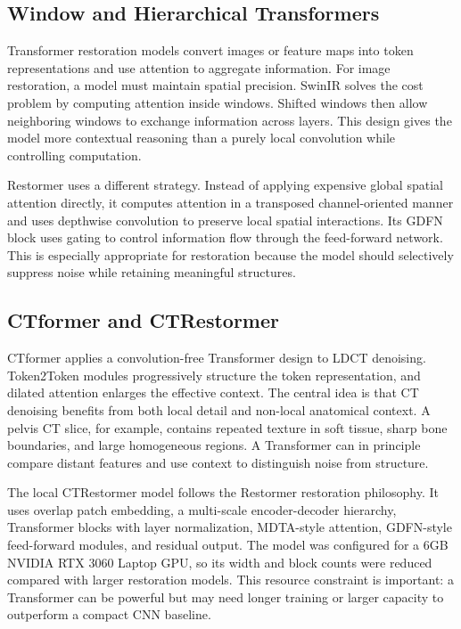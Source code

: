 \documentclass[journal]{IEEEtran}
\begin{document}
\subsection{Window and Hierarchical Transformers}
Transformer restoration models convert images or feature maps into token representations and use attention to aggregate information. For image restoration, a model must maintain spatial precision. SwinIR solves the cost problem by computing attention inside windows. Shifted windows then allow neighboring windows to exchange information across layers. This design gives the model more contextual reasoning than a purely local convolution while controlling computation.

Restormer uses a different strategy. Instead of applying expensive global spatial attention directly, it computes attention in a transposed channel-oriented manner and uses depthwise convolution to preserve local spatial interactions. Its GDFN block uses gating to control information flow through the feed-forward network. This is especially appropriate for restoration because the model should selectively suppress noise while retaining meaningful structures.

\subsection{CTformer and CTRestormer}
CTformer applies a convolution-free Transformer design to LDCT denoising. Token2Token modules progressively structure the token representation, and dilated attention enlarges the effective context. The central idea is that CT denoising benefits from both local detail and non-local anatomical context. A pelvis CT slice, for example, contains repeated texture in soft tissue, sharp bone boundaries, and large homogeneous regions. A Transformer can in principle compare distant features and use context to distinguish noise from structure.

The local CTRestormer model follows the Restormer restoration philosophy. It uses overlap patch embedding, a multi-scale encoder-decoder hierarchy, Transformer blocks with layer normalization, MDTA-style attention, GDFN-style feed-forward modules, and residual output. The model was configured for a 6GB NVIDIA RTX 3060 Laptop GPU, so its width and block counts were reduced compared with larger restoration models. This resource constraint is important: a Transformer can be powerful but may need longer training or larger capacity to outperform a compact CNN baseline.
\end{document}
